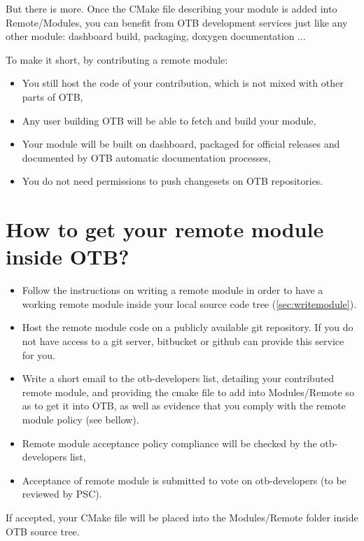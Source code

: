 But there is more. Once the CMake file describing your module is added into Remote/Modules, you can benefit from OTB development services just like any other module: dashboard build, packaging, doxygen documentation ...

To make it short, by contributing a remote module:

\begin{itemize}
       \item  You still host the code of your contribution, which is not mixed with other parts of OTB,
       \item  Any user building OTB will be able to fetch and build your module,
       \item  Your module will be built on dashboard, packaged for official releases and documented by OTB automatic documentation processes,
       \item  You do not need permissions to push changesets on OTB repositories.
\end{itemize}

\section{How to get your remote module inside OTB? }

\begin{itemize}
    \item Follow the instructions on writing a remote module in order to have a working remote module inside your local source code tree (\ref{sec:writemodule}).
    \item Host the remote module code on a publicly available git repository. If you do not have access to a git server, bitbucket or github can provide this service for you.
    \item Write a short email to the otb-developers list, detailing your contributed remote module, and providing the cmake file to add into Modules/Remote so as to get it into OTB, as well as evidence that you comply with the remote module policy (see bellow).
    \item Remote module acceptance policy compliance will be checked by the otb-developers list,
    \item Acceptance of remote module is submitted to vote on otb-developers (to be reviewed by PSC). 
 \end{itemize}

If accepted, your CMake file will be placed into the Modules/Remote folder inside OTB source tree.

